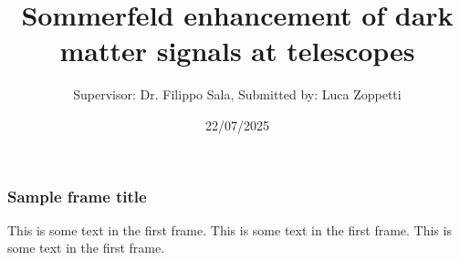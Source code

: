 \documentclass{beamer}
\title{Sommerfeld enhancement of dark matter signals at telescopes}
\author{Supervisor: Dr. Filippo Sala, Submitted by: Luca Zoppetti}
\institute{Alma Mater Studiorum - University of Bologna}
\date{22/07/2025}
\begin{document}
\frame{\titlepage}

\begin{frame}
\frametitle{Sample frame title}
This is some text in the first frame. This is some text in the first frame. This is some text in the first frame.
\end{frame}
\end{document}

